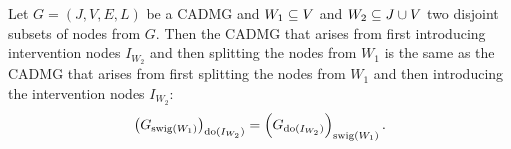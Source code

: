 \documentclass[main]{subfiles}
\begin{document}
\def\rowref{claim\_3\_15}
\label{claim_3_15}
%

\begin{Lem}
  Let $G=(J,V,E,L)$ be a CADMG and $W_1 \subseteq V$ and $W_2 \subseteq J \cup V$ two disjoint subsets of nodes from $G$.
    Then the CADMG that arises from first introducing intervention nodes $I_{W_2}$ and then splitting the nodes from $W_1$ is the same as the CADMG that arises from first splitting the nodes from $W_1$ and then introducing the intervention nodes $I_{W_2}$:
    \[  \left ( G_{\mathrm{swig}(W_1)} \right )_{\operatorname{do}(I_{W_2})} = \left ( G_{\operatorname{do}(I_{W_2})} \right )_{\mathrm{swig}(W_1)}. \]
\end{Lem}
\end{document}

